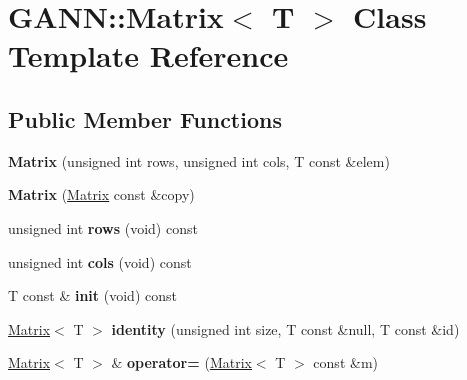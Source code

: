\hypertarget{class_g_a_n_n_1_1_matrix}{}\section{G\+A\+N\+N\+:\+:Matrix$<$ T $>$ Class Template Reference}
\label{class_g_a_n_n_1_1_matrix}
\subsection*{Public Member Functions}
\begin{DoxyCompactItemize}
\item 
\hypertarget{class_g_a_n_n_1_1_matrix_a370ad3ace72e48cf5ac3d2fd672dd679}{}{\bfseries Matrix} (unsigned int rows, unsigned int cols, T const \&elem)\label{class_g_a_n_n_1_1_matrix_a370ad3ace72e48cf5ac3d2fd672dd679}

\item 
\hypertarget{class_g_a_n_n_1_1_matrix_a9af1de05104cf864d0089575e772b74b}{}{\bfseries Matrix} (\hyperlink{class_g_a_n_n_1_1_matrix}{Matrix} const \&copy)\label{class_g_a_n_n_1_1_matrix_a9af1de05104cf864d0089575e772b74b}

\item 
\hypertarget{class_g_a_n_n_1_1_matrix_a14c1233ee25f1cd5823676277e1956f2}{}unsigned int {\bfseries rows} (void) const \label{class_g_a_n_n_1_1_matrix_a14c1233ee25f1cd5823676277e1956f2}

\item 
\hypertarget{class_g_a_n_n_1_1_matrix_adc449f757249fe5bfc5bdae3c809d7e7}{}unsigned int {\bfseries cols} (void) const \label{class_g_a_n_n_1_1_matrix_adc449f757249fe5bfc5bdae3c809d7e7}

\item 
\hypertarget{class_g_a_n_n_1_1_matrix_a5369d9c2dc7ae6a0941f1aba36f15259}{}T const \& {\bfseries init} (void) const \label{class_g_a_n_n_1_1_matrix_a5369d9c2dc7ae6a0941f1aba36f15259}

\item 
\hypertarget{class_g_a_n_n_1_1_matrix_ae61ef07a101463ad49ab8f9f7dd4f2fe}{}\hyperlink{class_g_a_n_n_1_1_matrix}{Matrix}$<$ T $>$ {\bfseries identity} (unsigned int size, T const \&null, T const \&id)\label{class_g_a_n_n_1_1_matrix_ae61ef07a101463ad49ab8f9f7dd4f2fe}

\item 
\hypertarget{class_g_a_n_n_1_1_matrix_a0aa93d1a66567637deb98c943f936fd4}{}\hyperlink{class_g_a_n_n_1_1_matrix}{Matrix}$<$ T $>$ \& {\bfseries operator=} (\hyperlink{class_g_a_n_n_1_1_matrix}{Matrix}$<$ T $>$ const \&m)\label{class_g_a_n_n_1_1_matrix_a0aa93d1a66567637deb98c943f936fd4}


\end{DoxyCompactItemize}

